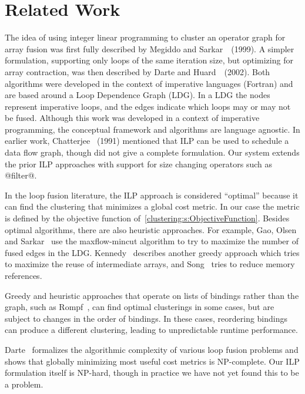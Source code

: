 \section{Related Work}
The idea of using integer linear programming to cluster an operator graph for array fusion was first fully described by Megiddo and Sarkar~\cite{megiddo1998optimal}~(1999).  A simpler formulation, supporting only loops of the same iteration size, but optimizing for array contraction, was then described by Darte and Huard~\cite{darte2002contraction}~(2002).  Both algorithms were developed in the context of imperative languages (Fortran) and are based around a Loop Dependence Graph (LDG).  In a LDG the nodes represent imperative loops, and the edges indicate which loops may or may not be fused.  Although this work was developed in a context of imperative programming, the conceptual framework and algorithms are language agnostic. In earlier work, Chatterjee~\cite{chatterjee1993nested} (1991) mentioned that ILP can be used to schedule a data flow graph, though did not give a complete formulation. Our system extends the prior ILP approaches with support for size changing operators such as @filter@.

In the loop fusion literature, the ILP approach is considered ``optimal'' because it can find the clustering that minimizes a global cost metric. In our case the metric is defined by the objective function of~\cref{clustering:s:ObjectiveFunction}. Besides optimal algorithms, there are also heuristic approaches. For example, Gao, Olsen and Sarkar~\cite{gao1993collective} use the maxflow-mincut algorithm to try to maximize the number of fused edges in the LDG.  Kennedy~\cite{kennedy2001fastgreedy} describes another greedy approach which tries to maximize the reuse of intermediate arrays, and Song~\cite{song2004improving} tries to reduce memory references.

Greedy and heuristic approaches that operate on lists of bindings rather than the graph, such as Rompf~\cite{rompf2013optimizing}, can find optimal clusterings in some cases, but are subject to changes in the order of bindings. In these cases, reordering bindings can produce a different clustering, leading to unpredictable runtime performance.

Darte~\cite{darte1999complexity} formalizes the algorithmic complexity of various loop fusion problems and shows that globally minimizing most useful cost metrics is NP-complete. Our ILP formulation itself is NP-hard, though in practice we have not yet found this to be a problem.

